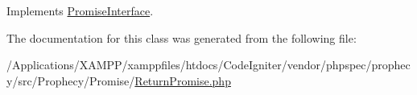 Implements \mbox{\hyperlink{interface_prophecy_1_1_promise_1_1_promise_interface_a2b8542872672f9ac4ed0c942f931f0c6}{Promise\+Interface}}.



The documentation for this class was generated from the following file\+:\begin{DoxyCompactItemize}
\item 
/\+Applications/\+X\+A\+M\+P\+P/xamppfiles/htdocs/\+Code\+Igniter/vendor/phpspec/prophecy/src/\+Prophecy/\+Promise/\mbox{\hyperlink{_return_promise_8php}{Return\+Promise.\+php}}\end{DoxyCompactItemize}
